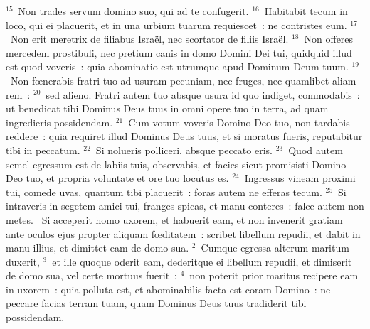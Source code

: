 ${}^{15}$~Non trades servum domino suo, qui ad te confugerit.
${}^{16}$~Habitabit tecum in loco, qui ei placuerit, et in una urbium tuarum requiescet~: ne contristes eum.
${}^{17}$~Non erit meretrix de filiabus Isra\"el, nec scortator de filiis Isra\"el.
${}^{18}$~Non offeres mercedem prostibuli, nec pretium canis in domo Domini Dei tui, quidquid illud est quod voveris~: quia abominatio est utrumque apud Dominum Deum tuum.
${}^{19}$~Non fœnerabis fratri tuo ad usuram pecuniam, nec fruges, nec quamlibet aliam rem~:
${}^{20}$~sed alieno. Fratri autem tuo absque usura id quo indiget, commodabis~: ut benedicat tibi Dominus Deus tuus in omni opere tuo in terra, ad quam ingredieris possidendam.
${}^{21}$~Cum votum voveris Domino Deo tuo, non tardabis reddere~: quia requiret illud Dominus Deus tuus, et si moratus fueris, reputabitur tibi in peccatum.
${}^{22}$~Si nolueris polliceri, absque peccato eris.
${}^{23}$~Quod autem semel egressum est de labiis tuis, observabis, et facies sicut promisisti Domino Deo tuo, et propria voluntate et ore tuo locutus es.
${}^{24}$~Ingressus vineam proximi tui, comede uvas, quantum tibi placuerit~: foras autem ne efferas tecum.
${}^{25}$~Si intraveris in segetem amici tui, franges spicas, et manu conteres~: falce autem non metes.
~\lettrine[lines=10,image=true,loversize=0.05,lraise=-0.03]{S}{}i acceperit homo uxorem, et habuerit eam, et non invenerit gratiam ante oculos ejus propter aliquam fœditatem~: scribet libellum repudii, et dabit in manu illius, et dimittet eam de domo sua.
${}^{2}$~Cumque egressa alterum maritum duxerit,
${}^{3}$~et ille quoque oderit eam, dederitque ei libellum repudii, et dimiserit de domo sua, vel certe mortuus fuerit~:
${}^{4}$~non poterit prior maritus recipere eam in uxorem~: quia polluta est, et abominabilis facta est coram Domino~: ne peccare facias terram tuam, quam Dominus Deus tuus tradiderit tibi possidendam.


